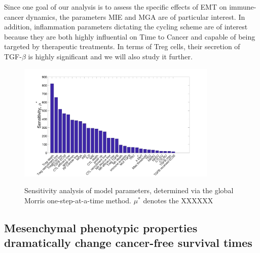 \documentclass[11pt]{article}
\begin{document}
Since one goal of our analysis is to assess the specific effects of EMT on immune-cancer dynamics, the parameters MIE and MGA are of particular interest.
In addition, inflammation parameters dictating the cycling scheme are of interest because they are both highly influential on Time to Cancer and capable of being targeted by therapeutic treatments.
In terms of Treg cells, their secretion of TGF-$\beta$ is highly significant and we will also study it further.


\begin{figure}
\center
{\includegraphics[width=0.85\textwidth]{Figure2/Figure2.jpg}}
\caption{Sensitivity analysis of model parameters, determined via the global Morris one-step-at-a-time method. $\mu^*$ denotes the XXXXXX}
\label{fig:MOAT}
\end{figure}




\subsection{Mesenchymal phenotypic properties dramatically change cancer-free survival times}\label{MesPars}
\end{document}
